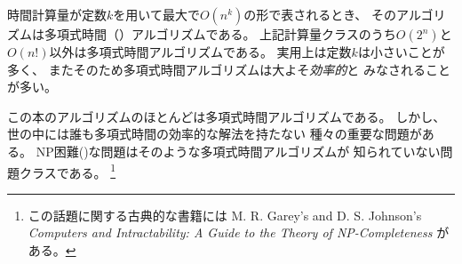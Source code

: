 \begin{comment}
\index{polynomial algorithm}
An algorithm is \key{polynomial}
if its time complexity is at most $O(n^k)$
where $k$ is a constant.
All the above time complexities except
$O(2^n)$ and $O(n!)$ are polynomial.
In practice, the constant $k$ is usually small,
and therefore a polynomial time complexity
roughly means that the algorithm is \emph{efficient}.
\end{comment}

時間計算量が定数$k$を用いて最大で$O(n^k)$の形で表されるとき、
そのアルゴリズムは多項式時間（）アルゴリズムである。
上記計算量クラスのうち$O(2^n)$と$O(n!)$以外は多項式時間アルゴリズムである。
実用上は定数$k$は小さいことが多く、
またそのため多項式時間アルゴリズムは大よそ\emph{効率的}と
みなされることが多い。

\begin{comment}
\index{NP-hard problem}

Most algorithms in this book are polynomial.
Still, there are many important problems for which
no polynomial algorithm is known, i.e.,
nobody knows how to solve them efficiently.
\key{NP-hard} problems are an important set
of problems, for which no polynomial algorithm
is known\footnote{A classic book on the topic is
M. R. Garey's and D. S. Johnson's
\emph{Computers and Intractability: A Guide to the Theory
of NP-Completeness} \cite{gar79}.}.
\end{comment}


この本のアルゴリズムのほとんどは多項式時間アルゴリズムである。
しかし、世の中には誰も多項式時間の効率的な解法を持たない
種々の重要な問題がある。
NP困難()な問題はそのような多項式時間アルゴリズムが
知られていない問題クラスである。
\footnote{この話題に関する古典的な書籍には
M. R. Garey's and D. S. Johnson's
\emph{Computers and Intractability: A Guide to the Theory
of NP-Completeness} \cite{gar79}がある。}

\begin{comment}
\section{Estimating efficiency}

By calculating the time complexity of an algorithm,
it is possible to check, before
implementing the algorithm, that it is
efficient enough for the problem.
The starting point for estimations is the fact that
a modern computer can perform some hundreds of
millions of operations in a second.
\end{comment}

